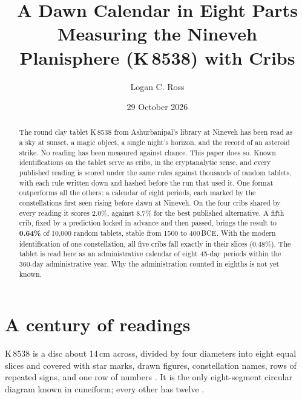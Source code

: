 \documentclass[11pt]{article}
\title{\textbf{A Dawn Calendar in Eight Parts}\\[4pt]
\large Measuring the Nineveh Planisphere (K\,8538) with Cribs}
\author{Logan C. Ross}
\date{29 October 2026}
\begin{document}
\maketitle

\begin{abstract}
\noindent
The round clay tablet K\,8538 from Ashurbanipal's library at Nineveh has been read as a sky at sunset,
a magic object, a single night's horizon, and the record of an asteroid strike. No reading has been
measured against chance. This paper does so. Known identifications on the tablet serve as cribs,
in the cryptanalytic sense, and every published reading is scored under the same rules against
thousands of random tablets, with each rule written down and hashed before the run that used it.
One format outperforms all the others: a calendar of eight periods, each marked by the
constellations first seen rising before dawn at Nineveh. On the four cribs shared by every reading
it scores 2.0\%, against 8.7\% for the best published alternative. A fifth crib, fixed by a
prediction locked in advance and then passed, brings the result to \textbf{0.64\%} of
10{,}000 random tablets, stable from 1500 to 400\,BCE. With the modern identification of one
constellation, all five cribs fall exactly in their slices (0.48\%). The tablet is read here as an
administrative calendar of eight 45-day periods within the 360-day administrative year. Why the
administration counted in eighths is not yet known.
\end{abstract}

\section{A century of readings}

K\,8538 is a disc about 14\,cm across, divided by four diameters into eight equal slices and covered
with star marks, drawn figures, constellation names, rows of repeated signs, and one row of numbers
\cite{king1912,cdli}. It is the only eight-segment circular diagram known in cuneiform; every other
has twelve \cite{monroe2022}.
\end{document}
